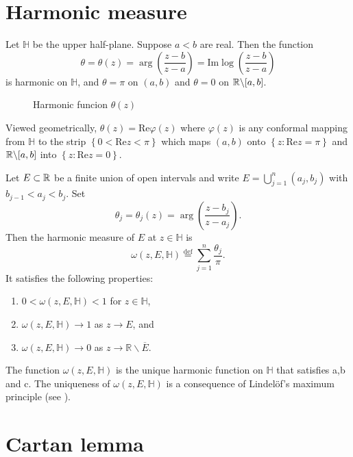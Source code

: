 \begin{appendices}
\section{Harmonic measure}
Let $\mathbb{H}$ be the upper half-plane. Suppose $a<b$ are real. Then the function 
\[
  \theta=\theta(z)=\arg \left( \frac{z-b}{z-a} \right) = \mathrm{Im} \log\left( \frac{z-b}{z-a} \right) 
\] is harmonic on $\mathbb{H}$, and  $\theta=\pi$ on $(a,b)$ and $\theta=0$ on $\mathbb{R}\backslash[a,b]$.

\begin{figure}[ht]
    \centering
    \caption{Harmonic funcion $\theta(z)$}
    \label{fig:harmonic-funcion}
\end{figure}

Viewed geometrically, $\theta (z)=\mathrm{Re} \varphi(z)$ where $\varphi(z)$ is any conformal mapping from $\mathbb{H}$ to the strip $\left\{ 0<\mathrm{Re}z<\pi \right\} $ which maps $(a,b)$ onto $\left\{ z:\mathrm{Re}z=\pi \right\} $ and $\mathbb{R} \backslash [a,b]$ into $\left\{ z:\mathrm{Re}z=0 \right\} $. 
\begin{definition}
Let $E\subset \mathbb{R}$ be a finite union of open intervals and write $E=\bigcup_{j=1}^{n}(a_j,b_j)$ with $b_{j-1}<a_j<b_j$. Set 
\[
  \theta_j = \theta_j(z)=\arg \left( \frac{z-b_j}{z-a_j} \right). 
\] 
Then the harmonic measure of $E$ at $z\in \mathbb{H}$ is
\begin{equation}
  \omega(z,E,\mathbb{H})\overset{\mathrm{def}}{=} \sum_{j=1}^{n} \frac{\theta_j}{\pi}.
\end{equation}
It satisfies the following properties:
\begin{enumerate}
  \item $0<\omega(z,E,\mathbb{H})<1$ for $z\in \mathbb{H}$,
  \item $\omega(z,E,\mathbb{H})\to 1$ as $z\to E$, and 
  \item $\omega(z,E,\mathbb{H})\to 0$ as $z\to \mathbb{R}\backslash \overline{E}$.
\end{enumerate}
\end{definition}
The function $\omega(z,E,\mathbb{H})$ is the unique harmonic function on $\mathbb{H}$ that satisfies a,b and c. The uniqueness of $\omega(z,E,\mathbb{H})$ is a consequence of Lindel\"{o}f's maximum principle (see \cite[2]{garnett2005harmonic}). 
\iffalse  \section{Cartan lemma}

\end{appendices}
